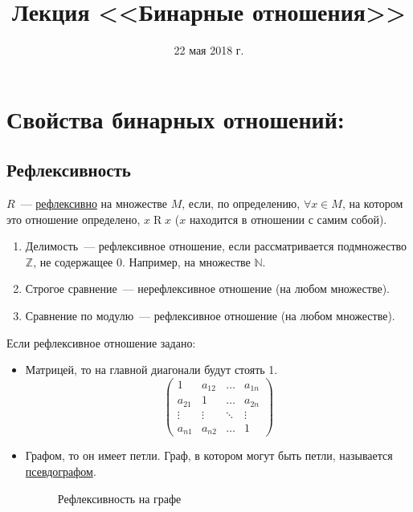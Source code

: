 \documentclass[russian]{lecture-notes}
\title{Лекция <<Бинарные отношения>>}
\date{22 мая 2018 г.}
\theoremstyle{definition}
\newcommand{\R}[2]{$#1\mathrel{R}#2$}
\begin{document}
	\maketitle


\section{Свойства бинарных отношений:}

\subsection{Рефлексивность}
\label{opr:refleks}
\begin{definition} 
	$R$~--- \underline{рефлексивно} на множестве $M$, если, по определению, $\forall x \in M$, на котором это отношение определено, \R{x}{x} ($x$ находится в отношении с самим собой).
\end{definition}

\begin{example}
	\begin{enumerate}
		\item Делимость~--- рефлексивное отношение, если рассматривается подмножество $\mathbb{Z}$, не содержащее 0. Например, на множестве $\mathbb{N}$.
		\item Строгое сравнение~--- нерефлексивное отношение (на любом множестве).
		\item Сравнение по модулю~--- рефлексивное отношение (на любом множестве).
	\end{enumerate}
\end{example}

Если рефлексивное отношение задано:
\begin{itemize}
	\item Матрицей, то на главной диагонали будут стоять 1.
	\begin{equation*}
	\left(
	\begin{array}{cccc}
	1 & a_{12} & \ldots & a_{1n}\\
	a_{21} & 1 & \ldots & a_{2n}\\
	\vdots & \vdots & \ddots & \vdots\\
	a_{n1} & a_{n2} & \ldots & 1
	\end{array}
	\right)
	\end{equation*}	
	
	\item Графом, то он имеет петли. Граф, в котором могут быть петли, называется \underline{псевдографом}.
	
	\begin{figure}[H]
		\centering
		\caption{Рефлексивность на графе}
		\label{fig:refleks}
	\end{figure}

\end{itemize}
\end{document}
